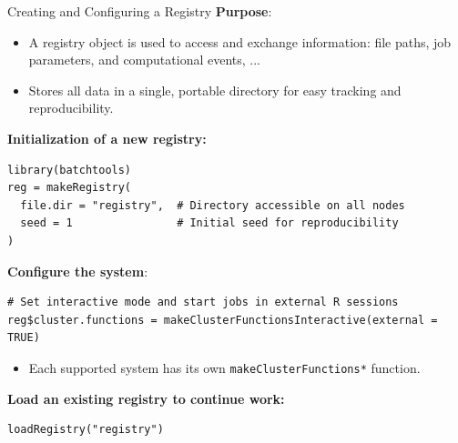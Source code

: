 \documentclass[10pt,compress,t,notes=noshow, xcolor=table]{beamer}
\begin{document}
\begin{frame}[fragile]{Creating and Configuring a Registry}
  \textbf{Purpose}: 
   \begin{itemize}
    \item A registry object is used to access and exchange information: file paths, job parameters, and computational events, ...
    \item Stores all data in a single, portable directory for easy tracking and reproducibility.
  \end{itemize}
\textbf{Initialization of a new registry:}
\begin{lstlisting}
library(batchtools)
reg = makeRegistry(
  file.dir = "registry",  # Directory accessible on all nodes
  seed = 1                # Initial seed for reproducibility
)
\end{lstlisting}

\textbf{Configure the system}: 

\begin{lstlisting}
# Set interactive mode and start jobs in external R sessions
reg$cluster.functions = makeClusterFunctionsInteractive(external = TRUE)
\end{lstlisting}
  \begin{itemize}
    \item Each supported system has its own \texttt{makeClusterFunctions*} function.%
  \end{itemize}

\textbf{Load an existing registry to continue work:}
  \begin{lstlisting}
loadRegistry("registry")
\end{lstlisting}
\end{frame}
\end{document}

